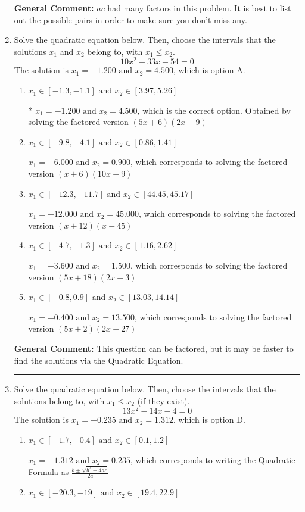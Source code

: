 \documentclass{extbook}[14pt]
\newcommand{\litem}[1]{\item #1

\rule{\textwidth}{0.4pt}}
\begin{document}
\begin{enumerate}
{\textbf{General Comment:} $ac$ had many factors in this problem. It is best to list out the possible pairs in order to make sure you don't miss any.
}
\litem{
Solve the quadratic equation below. Then, choose the intervals that the solutions $x_1$ and $x_2$ belong to, with $x_1 \leq x_2$.
\[ 10x^{2} -33 x -54 = 0 \]
The solution is \( x_1 = -1.200 \text{ and } x_2 = 4.500 \), which is option A.\begin{enumerate}[label=\Alph*.]
\item \( x_1 \in [-1.3, -1.1] \text{ and } x_2 \in [3.97, 5.26] \)

* $x_1 = -1.200 \text{ and } x_2 = 4.500$, which is the correct option. Obtained by solving the factored version $(5x + 6)(2x -9)$
\item \( x_1 \in [-9.8, -4.1] \text{ and } x_2 \in [0.86, 1.41] \)

$x_1 = -6.000 \text{ and } x_2 = 0.900$, which corresponds to solving the factored version $(x + 6)(10x -9)$
\item \( x_1 \in [-12.3, -11.7] \text{ and } x_2 \in [44.45, 45.17] \)

$x_1 = -12.000 \text{ and } x_2 = 45.000$, which corresponds to solving the factored version $(x + 12)(x -45)$
\item \( x_1 \in [-4.7, -1.3] \text{ and } x_2 \in [1.16, 2.62] \)

$x_1 = -3.600 \text{ and } x_2 = 1.500$, which corresponds to solving the factored version $(5x + 18)(2x -3)$
\item \( x_1 \in [-0.8, 0.9] \text{ and } x_2 \in [13.03, 14.14] \)

$x_1 = -0.400 \text{ and } x_2 = 13.500$, which corresponds to solving the factored version $(5x + 2)(2x -27)$
\end{enumerate}

\textbf{General Comment:} This question can be factored, but it may be faster to find the solutions via the Quadratic Equation.
}
\litem{
Solve the quadratic equation below. Then, choose the intervals that the solutions belong to, with $x_1 \leq x_2$ (if they exist).
\[ 13x^{2} -14 x -4 = 0 \]
The solution is \( x_1 = -0.235 \text{ and } x_2 = 1.312 \), which is option D.\begin{enumerate}[label=\Alph*.]
\item \( x_1 \in [-1.7, -0.4] \text{ and } x_2 \in [0.1, 1.2] \)

 $x_1 = -1.312 \text{ and } x_2 = 0.235$, which corresponds to writing the Quadratic Formula as $\frac{b \pm \sqrt{b^2 - 4ac}}{2a}$
\item \( x_1 \in [-20.3, -19] \text{ and } x_2 \in [19.4, 22.9] \)


\end{enumerate}}
\end{enumerate}
\end{document}
